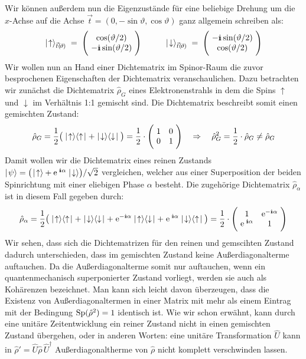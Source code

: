 Wir können außerdem nun die Eigenzustände für eine beliebige Drehung um die $x$-Achse auf die Achse $\vec{t}=(0,-\sin\vartheta,\cos\vartheta)$ ganz allgemein schreiben als: 
\begin{eqnarray*}
	\up_{\vec{t}(\!\vartheta\!\;\!)} \;=\; \Bigg(\!\begin{array}{c} \cos(\vartheta/2) \\ -\I\sin(\vartheta/2) \end{array}\!\Bigg) &\qquad& \down_{\vec{t}(\!\vartheta\;\!\!)} \;=\; \Bigg(\!\begin{array}{c} -\I\sin(\vartheta/2) \\ \cos(\vartheta/2) \end{array}\!\Bigg)
\end{eqnarray*}
Wir wollen nun an Hand einer Dichtematrix im Spinor-Raum die zuvor besprochenen Eigenschaften der Dichtematrix veranschaulichen. Dazu betrachten wir zunächst die Dichtematrix $\hat{\rho}_G$ eines Elektronenstrahls in dem die Spins $\uparrow$ und $\downarrow$ im Verhältnis 1:1 gemischt sind. Die Dichtematrix beschreibt somit einen gemischten Zustand: 
\begin{eqnarray*}
	\hat{\rho}_G = \frac12\big(\up\updg+\down\downdg\big) = \frac{1}{2}\cdot\Bigg(\!\begin{array}{cc} 1 & 0 \\ 0 & 1 \end{array}\!\Bigg) \quad\Rightarrow\quad \hat{\rho}_G^2 = \frac12 \cdot\hat{\rho}_G \neq \hat{\rho}_G
\end{eqnarray*}
Damit wollen wir die Dichtematrix eines reinen Zustands $\ket{\psi}=\big(\!\up+\e^{\;\I\alpha}\down\big)/\sqrt{2}$ vergleichen, welcher aus einer Superposition der beiden Spinrichtung mit einer eliebigen Phase $\alpha$ besteht. Die zugehörige Dichtematrix $\hat{\rho}_{\alpha}$ ist in diesem Fall gegeben durch: 
\begin{eqnarray*}
	\hat{\rho}_{\alpha} = \frac12\big(\up\updg+\down\downdg+\;\e^{-\I\alpha}\up\downdg+\;\e^{\;\I\alpha}\down\updg\big) = \frac{1}{2}\cdot\Bigg(\!\begin{array}{cc} 1 & \e^{-\I\alpha} \\ \e^{\;\I\alpha} & 1 \end{array}\!\Bigg)
\end{eqnarray*}
Wir sehen, dass sich die Dichtematrizen für den reinen und gemscihten Zustand dadurch unterschieden, dass im gemischten Zustand keine Außerdiagonalterme auftauchen. Da die Außerdiagonalterme somit nur auftauchen, wenn ein quantenmechanisch superponierter Zustand vorliegt, werden sie auch als Kohärenzen bezeichnet. Man kann sich leicht davon überzeugen, dass die Existenz von Außerdiagonaltermen in einer Matrix mit mehr als einem Eintrag mit der Bedingung $\text{Sp}(\hat{\rho}^2)=1$ identisch ist. Wie wir schon erwähnt, kann durch eine unitäre Zeitentwicklung ein reiner Zustand nicht in einen gemischten Zustand übergehen, oder in anderen Worten: eine unitäre Transformation $\hat{U}$ kann in $\hat{\rho}'=\hat{U}\hat{\rho}\,\hat{U}^{\dagger}$ Außerdiagonaltherme von $\hat{\rho}$ nicht komplett verschwinden lassen. 

